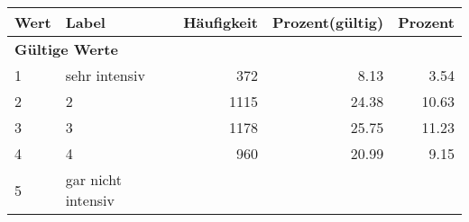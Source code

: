      \begin{longtable}{lXrrr}
     \toprule
     \textbf{Wert} & \textbf{Label} & \textbf{Häufigkeit} & \textbf{Prozent(gültig)} & \textbf{Prozent} \\
     \endhead
     \midrule
     \multicolumn{5}{l}{\textbf{Gültige Werte}}\\

     1 &
     \multicolumn{1}{X}{ sehr intensiv   } &


       \num{372} &
       \num[round-mode=places,round-precision=2]{8.13} &
         \num[round-mode=places,round-precision=2]{3.54} \\

     2 &
     \multicolumn{1}{X}{ 2   } &


       \num{1115} &
       \num[round-mode=places,round-precision=2]{24.38} &
         \num[round-mode=places,round-precision=2]{10.63} \\

     3 &
     \multicolumn{1}{X}{ 3   } &


       \num{1178} &
       \num[round-mode=places,round-precision=2]{25.75} &
         \num[round-mode=places,round-precision=2]{11.23} \\

     4 &
     \multicolumn{1}{X}{ 4   } &


       \num{960} &
       \num[round-mode=places,round-precision=2]{20.99} &
         \num[round-mode=places,round-precision=2]{9.15} \\

     5 &
     \multicolumn{1}{X}{ gar nicht intensiv   } &



\end{longtable}

